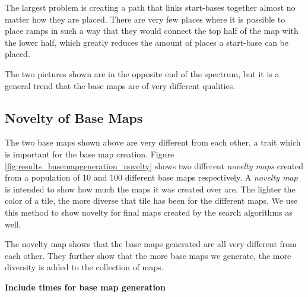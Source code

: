 The largest problem is creating a path that links start-bases together almost no matter how they are placed. There are very few places where it is possible to place ramps in such a way that they would connect the top half of the map with the lower half, which greatly reduces the amount of places a start-base can be placed.

The two pictures shown are in the opposite end of the spectrum, but it is a general trend that the base maps are of very different qualities. 

\subsection*{Novelty of Base Maps}

The two base maps shown above are very different from each other, a trait which is important for the base map creation. Figure \ref{fig:results_basemapgeneration_novelty} shows two different \textit{novelty maps} created from a population of 10 and 100 different base maps respectively. A \textit{novelty map} is intended to show how much the maps it was created over are. The lighter the color of a tile, the more diverse that tile has been for the different maps. We use this method to show novelty for final maps created by the search algorithms as well.


The novelty map shows that the base maps generated are all very different from each other. They further show that the more base maps we generate, the more diversity is added to the collection of maps.




\textbf{Include times for base map generation}